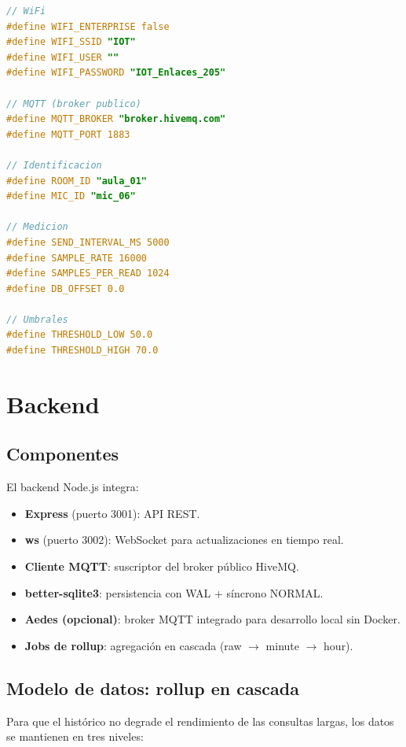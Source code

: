 \documentclass[11pt,a4paper,openany]{report}
\begin{document}
\begin{lstlisting}[language=C, caption={Archivo \texttt{firmware/src/config.h}}]
// WiFi
#define WIFI_ENTERPRISE false
#define WIFI_SSID "IOT"
#define WIFI_USER ""
#define WIFI_PASSWORD "IOT_Enlaces_205"

// MQTT (broker publico)
#define MQTT_BROKER "broker.hivemq.com"
#define MQTT_PORT 1883

// Identificacion
#define ROOM_ID "aula_01"
#define MIC_ID "mic_06"

// Medicion
#define SEND_INTERVAL_MS 5000
#define SAMPLE_RATE 16000
#define SAMPLES_PER_READ 1024
#define DB_OFFSET 0.0

// Umbrales
#define THRESHOLD_LOW 50.0
#define THRESHOLD_HIGH 70.0
\end{lstlisting}

\chapter{Backend}

\section{Componentes}

El backend Node.js integra:
\begin{itemize}
    \item \textbf{Express} (puerto 3001): API REST.
    \item \textbf{ws} (puerto 3002): WebSocket para actualizaciones en tiempo real.
    \item \textbf{Cliente MQTT}: suscriptor del broker p\'ublico HiveMQ.
    \item \textbf{better-sqlite3}: persistencia con WAL + s\'incrono NORMAL.
    \item \textbf{Aedes (opcional)}: broker MQTT integrado para desarrollo local sin Docker.
    \item \textbf{Jobs de rollup}: agregaci\'on en cascada (raw $\rightarrow$ minute $\rightarrow$ hour).
\end{itemize}

\section{Modelo de datos: rollup en cascada}
\label{sec:rollup}

Para que el hist\'orico no degrade el rendimiento de las consultas largas, los datos se mantienen en tres niveles:
\end{document}
